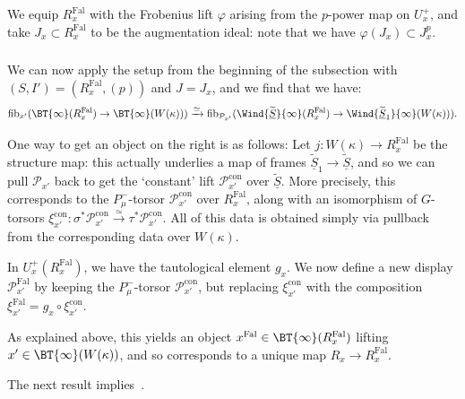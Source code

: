 \documentclass[10pt]{amsart}
\begin{document}
We equip $R^{\mathrm{Fal}}_x$ with the Frobenius lift $\varphi$ arising from the $p$-power map on $U^+_x$, and take $J_x\subset R^{\mathrm{Fal}}_x$ to be the augmentation ideal: note that we have $\varphi(J_x)\subset J_x^p$. 

\subsubsection{}
We can now apply the setup from the beginning of the subsection with $(S,I') = (R^{\mathrm{Fal}}_x,(p))$ and $J = J_x$, and we find that we have:
\[
\mathrm{fib}_{x'}(\BT{\infty}(R^{\mathrm{Fal}}_x) \to \BT{\infty}(W(\kappa)))\xrightarrow{\simeq}\mathrm{fib}_{\mathcal{P}_{x'}}(\Wind{\widetilde{\underline{S}}}{\infty}(R^{\mathrm{Fal}}_x)\to \Wind{\widetilde{\underline{S}}_1}{\infty}(W(\kappa))).
\]

One way to get an object on the right is as follows: Let $j:W(\kappa)\to R^{\mathrm{Fal}}_x$ be the structure map: this actually underlies a map of frames $\underline{\widetilde{S}}_1\to \underline{\widetilde{S}}$, and so we can pull $\mathcal{P}_{x'}$ back to get the `constant' lift $\mathcal{P}^{\mathrm{con}}_{x'}$ over $\underline{\widetilde{S}}$. More precisely, this corresponds to the $P^-_\mu$-torsor $\mathcal{P}^{\mathrm{con}}_{x'}$ over $R^{\mathrm{Fal}}_x$, along with an isomorphism of $G$-torsors $\xi^{\mathrm{con}}_{x'}:\sigma^*\mathcal{P}^{\mathrm{con}}_{x'}\xrightarrow{\simeq}\tau^*\mathcal{P}^{\mathrm{con}}_{x'}$. All of this data is obtained simply via pullback from the corresponding data over $W(\kappa)$.

In $U^+_x(R^{\mathrm{Fal}}_x)$, we have the tautological element $g_x$. We now define a new display $\mathcal{P}^{\mathrm{Fal}}_{x'}$ by keeping the $P^-_\mu$-torsor $\mathcal{P}^{\mathrm{con}}_{x'}$, but replacing $\xi^{\mathrm{con}}_{x'}$ with the composition $\xi^{\mathrm{Fal}}_{x'} = g_x\circ \xi^{\mathrm{con}}_{x'}$.

As explained above, this yields an object $x^{\mathrm{Fal}}\in \BT{\infty}(R^{\mathrm{Fal}}_x)$ lifting $x'\in \BT{\infty}(W(\kappa))$, and so corresponds to a unique map $R_x\to R^{\mathrm{Fal}}_x$.

The next result implies~\cite[Conjecture 7.2.2]{ito2023deformation}.
\end{document}
